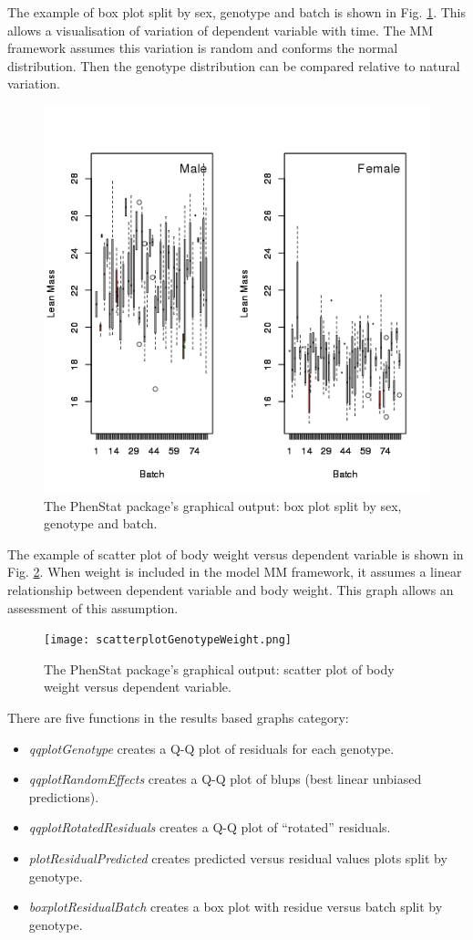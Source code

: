 \documentclass[12pt,a4paper]{article}
\begin{document}
The example of box plot split by sex, genotype and batch is shown in Fig. \ref{fig:08}. This allows a visualisation of variation of dependent variable with time. The MM framework assumes this variation is random and conforms the normal distribution. Then the genotype distribution can be compared relative to natural variation. 
\begin{figure}[!htpb]%
\centerline{\includegraphics[scale=0.5]{boxplotSexGenotypeBatch.png}}
\caption{The PhenStat package's graphical output: box plot split by sex, genotype and batch.}\label{fig:08}
\end{figure}

The example of scatter plot of body weight versus dependent variable is shown in Fig. \ref{fig:09}. When weight is included in the model MM framework, it assumes a linear relationship between dependent variable and body weight. This graph allows an assessment of this assumption. 
\begin{figure}[!htpb]%
\centerline{\texttt{[image: scatterplotGenotypeWeight.png]}}
\caption{The PhenStat package's graphical output: scatter plot of body weight versus dependent variable.}\label{fig:09}
\end{figure}

There are five functions in the results based graphs category:
\begin{itemize}
\item \textit{qqplotGenotype} creates a Q-Q plot of residuals for each genotype.
\item \textit{qqplotRandomEffects} creates a Q-Q plot of blups (best linear unbiased predictions).
\item \textit{qqplotRotatedResiduals} creates a Q-Q plot of ``rotated'' residuals.
\item \textit{plotResidualPredicted} creates predicted versus residual values plots split by genotype.
\item \textit{boxplotResidualBatch} creates a box plot with residue versus batch split by genotype.
\end{itemize}
\end{document}
